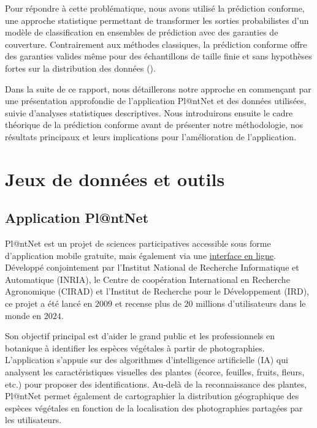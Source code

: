 \documentclass[a4paper,12pt]{article}
\begin{document}
\vspace{0.2cm}

Pour répondre à cette problématique, nous avons utilisé la prédiction conforme, une approche statistique permettant de transformer les sorties probabilistes d'un modèle de classification en ensembles de prédiction avec des garanties de couverture. Contrairement aux méthodes classiques, la prédiction conforme offre des garanties valides même pour des échantillons de taille finie et sans hypothèses fortes sur la distribution des données (\cite{Angelopoulos}).

\vspace{0.2cm}

Dans la suite de ce rapport, nous détaillerons notre approche en commençant par une présentation approfondie de l'application Pl@ntNet et des données utilisées, suivie d'analyses statistiques descriptives. Nous introduirons ensuite le cadre théorique de la prédiction conforme avant de présenter notre méthodologie, nos résultats principaux et leurs implications pour l'amélioration de l'application.


\section{Jeux de données et outils}


\subsection{Application Pl@ntNet}

Pl@ntNet est un projet de sciences participatives accessible sous forme d’application mobile gratuite, mais également via une \href{https://identify.plantnet.org/fr}{interface en ligne}. Développé conjointement par l'Institut National de Recherche Informatique et Automatique (INRIA), le Centre de coopération International en Recherche Agronomique (CIRAD) et l'Institut de Recherche pour le Développement (IRD), ce projet a été lancé en $2009$ et recense plus de $20$ millions d'utilisateurs dans le monde en $2024$. 

\vspace{0.2cm}

Son objectif principal est d'aider le grand public et les professionnels en botanique à identifier les espèces végétales à partir de photographies. L'application s'appuie sur des algorithmes d'intelligence artificielle (IA) qui analysent les caractéristiques visuelles des plantes (écorce, feuilles, fruits, fleurs, etc.) pour proposer des identifications. Au-delà de la reconnaissance des plantes, Pl@ntNet permet également de cartographier la distribution géographique des espèces végétales en fonction de la localisation des photographies partagées par les utilisateurs.
\end{document}
